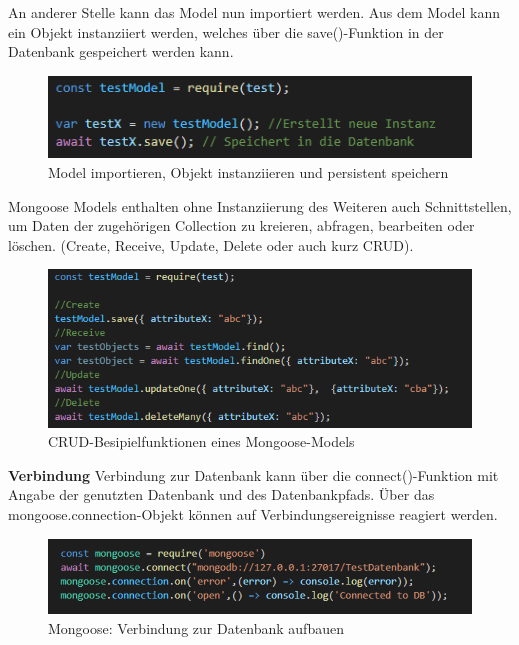 An anderer Stelle kann das Model nun importiert werden. Aus dem Model kann ein Objekt instanziiert werden, welches über die save()-Funktion in der Datenbank gespeichert werden kann.

\begin{figure}[h]
\centering
\includegraphics{images/nodeJS_mongooseModellimport.PNG}
\caption{Model importieren, Objekt instanziieren und persistent speichern}
\end{figure}

Mongoose Models enthalten ohne Instanziierung des Weiteren auch Schnittstellen, um Daten der zugehörigen Collection zu kreieren, abfragen, bearbeiten oder löschen. (Create, Receive, Update, Delete oder auch kurz CRUD).
\newline
\newpage
\begin{figure}[h]
\centering
\includegraphics{images/nodeJS_mongooseModellCRUD.PNG}
\caption{CRUD-Besipielfunktionen eines Mongoose-Models}
\end{figure}

\textbf{Verbindung}
\newline
Verbindung zur Datenbank kann über die connect()-Funktion mit Angabe der genutzten Datenbank und des Datenbankpfads. Über das mongoose.connection-Objekt können auf Verbindungsereignisse reagiert werden. 
\newline


\begin{figure}[h]
\centering
\includegraphics{images/nodeJS_mongooseVerbindung.PNG}
\caption{Mongoose: Verbindung zur Datenbank aufbauen}
\end{figure}

